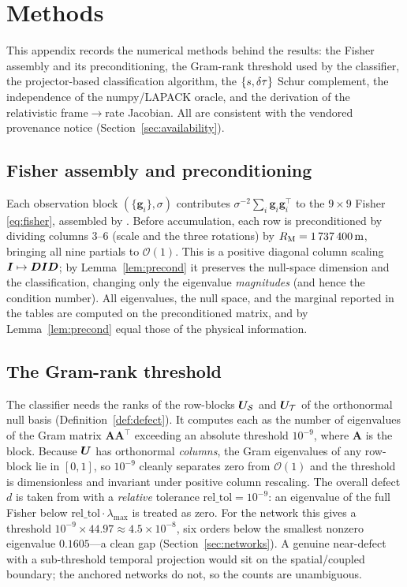 \section{Methods}
\label{app:methods}

This appendix records the numerical methods behind the results: the Fisher assembly and its
preconditioning, the Gram-rank threshold used by the classifier, the projector-based
classification algorithm, the $\{s,\delta\tau\}$ Schur complement, the independence of the
numpy/LAPACK oracle, and the derivation of the relativistic frame$\to$rate Jacobian. All are
consistent with the vendored provenance notice (Section~\ref{sec:availability}).

\subsection{Fisher assembly and preconditioning}
\label{app:fisher}

Each observation block $(\{\bm g_i\},\sigma)$ contributes
$\sigma^{-2}\sum_i\bm g_i\bm g_i^\top$ to the $9\times9$ Fisher \eqref{eq:fisher}, assembled
by . Before accumulation, each row is preconditioned by
dividing columns $3$--$6$ (scale and the three rotations) by $R_{\mathrm{M}}=\SI{1737400}{m}$,
bringing all nine partials to $\mathcal{O}(1)$. This is a positive diagonal column scaling
$\bm{I}\mapsto\bm D\bm{I}\bm D$; by Lemma~\ref{lem:precond} it preserves the null-space
dimension and the classification, changing only the eigenvalue \emph{magnitudes} (and hence
the condition number). All eigenvalues, the null space, and the marginal reported in the
tables are computed on the preconditioned matrix, and by Lemma~\ref{lem:precond} equal those
of the physical information.

\subsection{The Gram-rank threshold}
\label{app:gram}

The classifier needs the ranks of the row-blocks $\bm{U}_{\mathcal{S}}$ and $\bm{U}_{\mathcal{T}}$ of the
orthonormal null basis (Definition~\ref{def:defect}). It computes each as the number of
eigenvalues of the Gram matrix $\bm A\bm A^\top$ exceeding an absolute threshold $10^{-9}$,
where $\bm A$ is the block. Because $\bm{U}$ has orthonormal \emph{columns}, the Gram
eigenvalues of any row-block lie in $[0,1]$, so $10^{-9}$ cleanly separates zero from
$\mathcal{O}(1)$ and the threshold is dimensionless and invariant under positive column
rescaling. The overall defect $d$ is
taken from  with a \emph{relative} tolerance $\text{rel\_tol}=10^{-9}$: an
eigenvalue of the full Fisher below $\text{rel\_tol}\cdot\lambda_{\max}$ is treated as zero.
For the  network this gives a threshold
$10^{-9}\times44.97\approx4.5\times10^{-8}$, six orders below the smallest nonzero eigenvalue
$0.1605$---a clean gap (Section~\ref{sec:networks}). A genuine near-defect with a
sub-threshold temporal projection would sit on the spatial/coupled boundary; the anchored
networks do not, so the counts are unambiguous.

